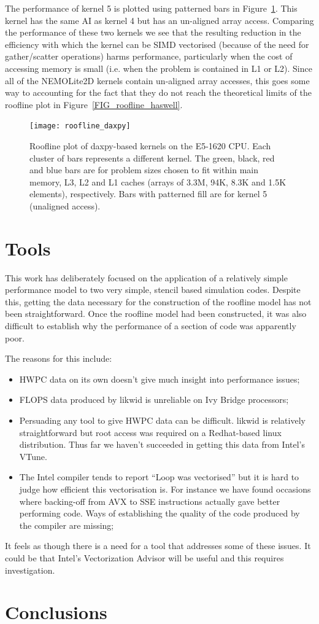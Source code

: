 \documentclass[12pt]{article}
\begin{document}
The performance of kernel 5 is plotted using patterned bars in
Figure~\ref{FIG_daxpy_roofline}. This kernel has the same AI as kernel
4 but has an un-aligned array access. Comparing the performance of
these two kernels we see that the resulting reduction in the
efficiency with which the kernel can be SIMD vectorised (because of
the need for gather/scatter operations) harms performance,
particularly when the cost of accessing memory is small (i.e. when the
problem is contained in L1 or L2). Since all of the NEMOLite2D kernels
contain un-aligned array accesses, this goes some way to accounting
for the fact that they do not reach the theoretical limits of the
roofline plot in Figure~\ref{FIG_roofline_haswell}.

\begin{figure}
\texttt{[image: roofline\_daxpy]}
\caption{Roofline plot of daxpy-based kernels on the E5-1620 CPU. Each
  cluster of bars represents a different kernel. The green, black, red and
  blue bars are for problem sizes chosen to fit within main memory, L3, L2 and
  L1 caches (arrays of 3.3M, 94K, 8.3K and 1.5K elements),
  respectively. Bars with patterned fill are for kernel 5 (unaligned
  access).}
\label{FIG_daxpy_roofline}
\end{figure}

\section{Tools}

This work has deliberately focused on the application of a relatively
simple performance model to two very simple, stencil based simulation
codes.  Despite this, getting the data necessary for the construction
of the roofline model has not been straightforward. Once the roofline
model had been constructed, it was also difficult to establish why the
performance of a section of code was apparently poor.

The reasons for this include:
\begin{itemize}
\item HWPC data on its own doesn't give much insight into performance issues;
\item FLOPS data produced by likwid is unreliable on Ivy Bridge processors;
\item Persuading any tool to give HWPC data can be difficult. likwid
  is relatively straightforward but root access was required on a
  Redhat-based linux distribution. Thus far we haven't succeeded in
  getting this data from Intel's VTune.
\item The Intel compiler tends to report ``Loop was vectorised'' but
  it is hard to judge how efficient this vectorisation is. For
  instance we have found occasions where backing-off from AVX to SSE
  instructions actually gave better performing code. Ways of
  establishing the quality of the code produced by the compiler are
  missing;
\end{itemize}

It feels as though there is a need for a tool that addresses some of
these issues. It could be that Intel's Vectorization Advisor will be
useful and this requires investigation.


\section{Conclusions}



\end{document}

